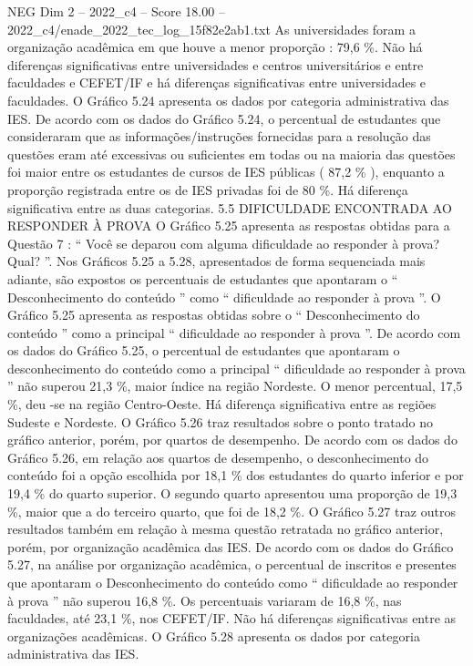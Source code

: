 \begin{textsample}{NEG Dim 2 – 2022\_c4 – Score 18.00 – 2022\_c4/enade\_2022\_tec\_log\_15f82e2ab1.txt}
As universidades foram a organização acadêmica em que houve a menor proporção : 79,6 \%.
Não há diferenças significativas entre universidades e centros universitários e entre faculdades e CEFET/IF e há diferenças significativas entre universidades e faculdades.
O Gráfico 5.24 apresenta os dados por categoria administrativa das IES.
De acordo com os dados do Gráfico 5.24, o percentual de estudantes que consideraram que as informações/instruções fornecidas para a resolução das questões eram até excessivas ou suficientes em todas ou na maioria das questões foi maior entre os estudantes de cursos de IES públicas ( 87,2 \% ), enquanto a proporção registrada entre os de IES privadas foi de 80 \%.
Há diferença significativa entre as duas categorias. 5.5 DIFICULDADE ENCONTRADA AO RESPONDER À PROVA O Gráfico 5.25 apresenta as respostas obtidas para a Questão 7 : “ Você se deparou com alguma dificuldade ao responder à prova?
Qual? ”.
Nos Gráficos 5.25 a 5.28, apresentados de forma sequenciada mais adiante, são expostos os percentuais de estudantes que apontaram o “ Desconhecimento do conteúdo ” como “ dificuldade ao responder à prova ”.
O Gráfico 5.25 apresenta as respostas obtidas sobre o “ Desconhecimento do conteúdo ” como a principal “ dificuldade ao responder à prova ”.
De acordo com os dados do Gráfico 5.25, o percentual de estudantes que apontaram o desconhecimento do conteúdo como a principal “ dificuldade ao responder à prova ” não superou 21,3 \%, maior índice na região Nordeste.
O menor percentual, 17,5 \%, deu -se na região Centro-Oeste.
Há diferença significativa entre as regiões Sudeste e Nordeste.
O Gráfico 5.26 traz resultados sobre o ponto tratado no gráfico anterior, porém, por quartos de desempenho.
De acordo com os dados do Gráfico 5.26, em relação aos quartos de desempenho, o desconhecimento do conteúdo foi a opção escolhida por 18,1 \% dos estudantes do quarto inferior e por 19,4 \% do quarto superior.
O segundo quarto apresentou uma proporção de 19,3 \%, maior que a do terceiro quarto, que foi de 18,2 \%.
O Gráfico 5.27 traz outros resultados também em relação à mesma questão retratada no gráfico anterior, porém, por organização acadêmica das IES.
De acordo com os dados do Gráfico 5.27, na análise por organização acadêmica, o percentual de inscritos e presentes que apontaram o Desconhecimento do conteúdo como “ dificuldade ao responder à prova ” não superou 16,8 \%.
Os percentuais variaram de 16,8 \%, nas faculdades, até 23,1 \%, nos CEFET/IF.
Não há diferenças significativas entre as organizações acadêmicas.
O Gráfico 5.28 apresenta os dados por categoria administrativa das IES.

\end{textsample}
